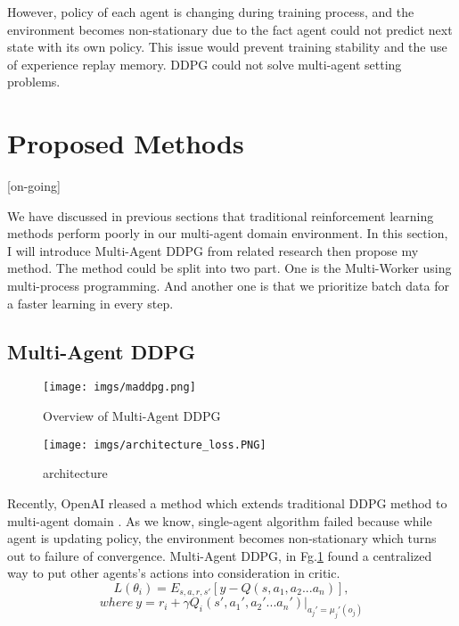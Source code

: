 \documentclass[11pt,twocolumn]{jarticle} %
\begin{document}
However, policy of each agent is changing during training process, and the environment becomes non-stationary due to the fact agent could not predict next state with its own policy. This issue would prevent training stability and the use of experience replay memory. DDPG could not solve multi-agent setting problems. \par

\section{Proposed Methods}[on-going]

We have discussed in previous sections that traditional reinforcement learning methods perform poorly in our multi-agent domain environment. In this section, I will introduce Multi-Agent DDPG from related research then propose my method. The method could be split into two part. One is the Multi-Worker using multi-process programming. And another one is that we prioritize batch data for a faster learning in every step.

\subsection{Multi-Agent DDPG}
\begin{figure}[ht]
 \begin{center}
  \texttt{[image: imgs/maddpg.png]}
  \caption{Overview of Multi-Agent DDPG\cite{maddpg}}
  \label{fig:maddpg}
 \end{center}
\end{figure}

\begin{figure*}[h]
 \begin{center}
  \texttt{[image: imgs/architecture\_loss.PNG]}
  \caption{architecture}
  \label{fig:architecture}
 \end{center}
\end{figure*}

Recently, OpenAI rleased a method which extends traditional DDPG method to multi-agent domain \cite{maddpg}. As we know, single-agent algorithm failed because while agent is updating policy, the environment becomes non-stationary which turns out to failure of convergence. Multi-Agent DDPG, in Fg.\ref{fig:maddpg} found a centralized way to put other agents's actions into consideration in critic.
\begin{equation}
L(\theta_i) = E_{s,a,r,s'}[y - Q(s, a_1, a_2 ... a_n)],  
\end{equation}
$$where\ y = r_i + \gamma{Q_i}(s', a_1', a_2' ... a_n') | _{a_j'=\mu_j'(o_j)}$$
\end{document}

